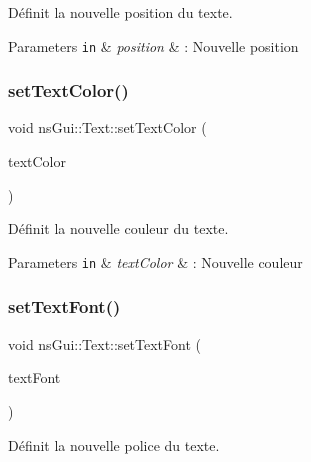 Définit la nouvelle position du texte. 


\begin{DoxyParams}[1]{Parameters}
\mbox{\tt in}  & {\em position} & \+: Nouvelle position \\
\hline
\end{DoxyParams}
\mbox{\label{classns_gui_1_1_text_a9e10bb21647ce95f034a4205562e222a}} 
\subsubsection{\texorpdfstring{set\+Text\+Color()}{setTextColor()}}
{\footnotesize\ttfamily void ns\+Gui\+::\+Text\+::set\+Text\+Color (\begin{DoxyParamCaption}\item[{const \hyperlink{classns_graphics_1_1_r_g_b_acolor}{ns\+Graphics\+::\+R\+G\+B\+Acolor} \&}]{text\+Color }\end{DoxyParamCaption})}



Définit la nouvelle couleur du texte. 


\begin{DoxyParams}[1]{Parameters}
\mbox{\tt in}  & {\em text\+Color} & \+: Nouvelle couleur \\
\hline
\end{DoxyParams}
\mbox{\label{classns_gui_1_1_text_afa19265ff44bdab288fa2a7100dd9c50}} 
\subsubsection{\texorpdfstring{set\+Text\+Font()}{setTextFont()}}
{\footnotesize\ttfamily void ns\+Gui\+::\+Text\+::set\+Text\+Font (\begin{DoxyParamCaption}\item[{const \hyperlink{classns_gui_1_1_glut_font}{Glut\+Font} \&}]{text\+Font }\end{DoxyParamCaption})}



Définit la nouvelle police du texte. 


